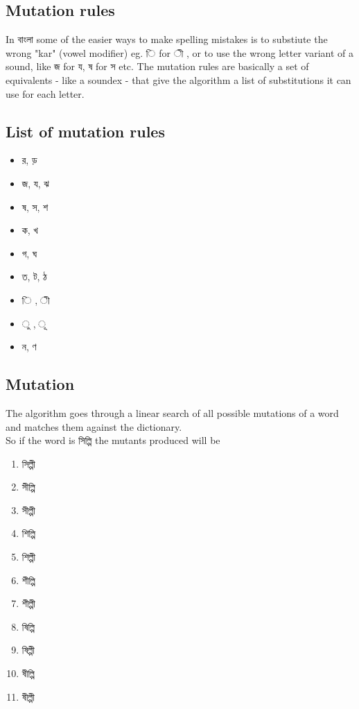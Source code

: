 \documentclass[11pt]{article}
\begin{document}
\subsection{Mutation rules}
In {\bng বাংলা} some of the easier ways to make spelling mistakes is to substiute the wrong "kar" (vowel modifier) eg. {\bng ি} for {\bng ী} , or to use the wrong letter variant of a sound, like {\bng জ} for {\bng য},  {\bng ষ} for {\bng স} etc. 
The mutation rules are basically a set of equivalents - like a soundex - that give the algorithm a list of substitutions it can use for each letter.

\pagebreak
\subsection{List of mutation rules}
{\lbng
\begin{itemize}
\item র, ড়
\item জ, য, ঝ
\item ষ, স, শ
\item ক, খ
\item গ, ঘ
\item ত, ট, ঠ
\item ি , ী
\item  ু , ূ
\item ন, ণ
\end{itemize}
}

\subsection{Mutation}
The algorithm goes through a linear search of all possible mutations of a word and matches them against the dictionary. \\
So if the word is {\bng সিল্পি} the mutants produced will be
{\lbng
\begin{enumerate}
\item সিল্পী
\item সীল্পি
\item সীল্পী
\item শিল্পি
\item শিল্পী
\item শীল্পি
\item শীল্পী
\item ষিল্পি
\item ষিল্পী
\item ষীল্পি
\item ষীল্পী
\end{enumerate}
}
\end{document}
